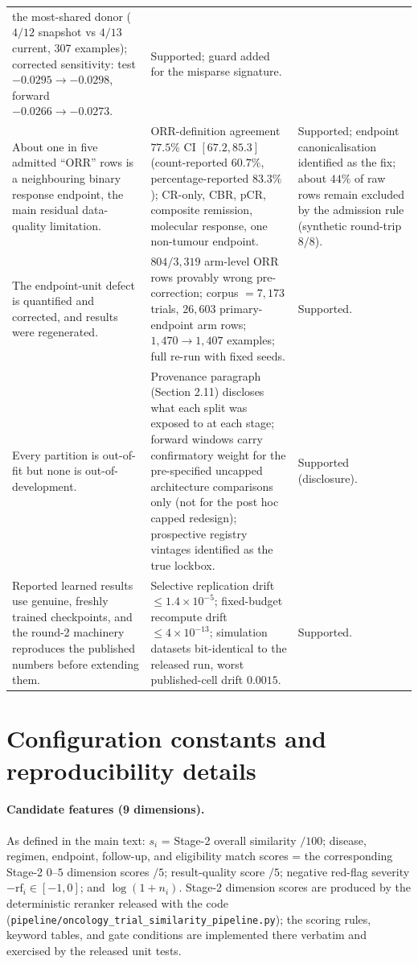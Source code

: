 \documentclass[11pt]{article}
\begin{document}
\begin{longtable}{p{} p{} p{}}
the most-shared donor ($4/12$ snapshot vs $4/13$ current, 307 examples);
corrected sensitivity: test $-0.0295 \to -0.0298$, forward $-0.0266 \to
-0.0273$. & Supported; guard added for the misparse signature. \\
About one in five admitted ``ORR'' rows is a neighbouring binary response
endpoint, the main residual data-quality limitation. & ORR-definition
agreement $77.5\%$ CI $[67.2,85.3]$ (count-reported $60.7\%$,
percentage-reported $83.3\%$); CR-only, CBR, pCR, composite remission,
molecular response, one non-tumour endpoint. & Supported; endpoint
canonicalisation identified as the fix; about $44\%$ of raw rows remain
excluded by the admission rule (synthetic round-trip $8/8$). \\
The endpoint-unit defect is quantified and corrected, and results were
regenerated. & $804/3{,}319$ arm-level ORR rows provably wrong pre-correction;
corpus $= 7{,}173$ trials, $26{,}603$ primary-endpoint arm rows;
$1{,}470 \to 1{,}407$ examples; full re-run with fixed seeds. & Supported. \\
Every partition is out-of-fit but none is out-of-development. & Provenance
paragraph (Section 2.11) discloses what each split was exposed to at each
stage; forward windows carry confirmatory weight for the pre-specified
uncapped architecture comparisons only (not for the post hoc capped
redesign); prospective registry
vintages identified as the true lockbox. & Supported (disclosure). \\
Reported learned results use genuine, freshly trained checkpoints, and the
round-2 machinery reproduces the published numbers before extending them. &
Selective replication drift $\le 1.4\times10^{-5}$; fixed-budget recompute
drift $\le 4\times10^{-13}$; simulation datasets bit-identical to the
released run, worst published-cell drift $0.0015$. & Supported. \\
\bottomrule
\end{longtable}

\section{Configuration constants and reproducibility details}

\paragraph{Candidate features (9 dimensions).} As defined in the main text:
$s_i$ = Stage-2 overall similarity $/100$; disease, regimen, endpoint,
follow-up, and eligibility match scores = the corresponding Stage-2 $0$--$5$
dimension scores $/5$; result-quality score $/5$; negative red-flag severity
$-\mathrm{rf}_i \in [-1,0]$; and $\log(1+n_i)$. Stage-2 dimension scores are
produced by the deterministic reranker released with the code
(\texttt{pipeline/\allowbreak oncology\_trial\_similarity\_pipeline.py}); the scoring
rules, keyword tables, and gate conditions are implemented there verbatim and
exercised by the released unit tests.
\end{document}
